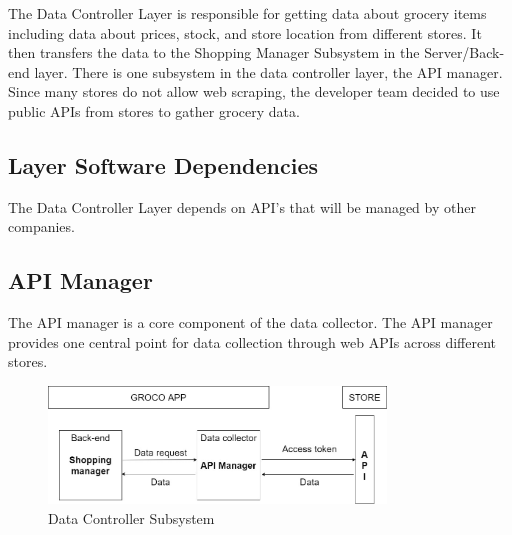 The Data Controller Layer is responsible for getting data about grocery items including data about prices, stock, and store location from different stores. It then transfers the data to the Shopping Manager Subsystem in the Server/Back-end layer. There is one subsystem in the data controller layer, the API manager. Since many stores do not allow web scraping, the developer team decided to use public APIs from stores to gather grocery data.


\subsection{Layer Software Dependencies}
The Data Controller Layer depends on API's that will be managed by other companies.

\subsection{API Manager}
The API manager is a core component of the data collector. The API manager provides one central point for data collection through web APIs across different stores.

\begin{figure}[h!]
	\centering
 	\includegraphics[width=0.80\textwidth]{images/dataCollectorFlowChart.jpg}
 \caption{Data Controller Subsystem}
\end{figure}

